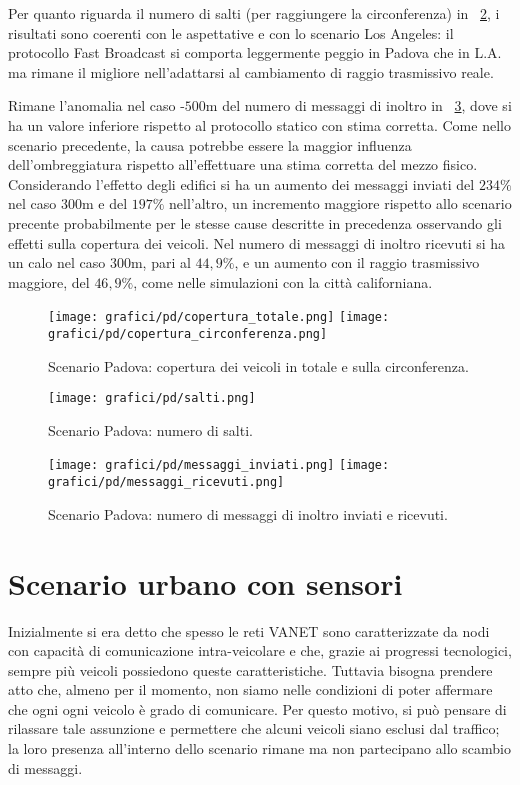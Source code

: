 Per quanto riguarda il numero di salti (per raggiungere la circonferenza) in \figurename~\ref{fig:risultati-padova-salti},
i risultati sono coerenti con le aspettative e con lo scenario Los Angeles:
il protocollo Fast Broadcast si comporta leggermente peggio in Padova che in L.A.
ma rimane il migliore nell'adattarsi al cambiamento di raggio trasmissivo reale.

Rimane l'anomalia nel caso \statica{}-$500$m del numero di messaggi di inoltro in \figurename~\ref{fig:risultati-padova-messaggi},
dove si ha un valore inferiore rispetto al protocollo statico con stima corretta.
Come nello scenario precedente, la causa potrebbe essere la maggior influenza dell'ombreggiatura rispetto
all'effettuare una stima corretta del mezzo fisico.
Considerando l'effetto degli edifici si ha un aumento dei messaggi inviati del $234\%$ nel caso $300$m e del $197\%$ nell'altro,
un incremento maggiore rispetto allo scenario precente probabilmente per le stesse cause
descritte in precedenza osservando gli effetti sulla copertura dei veicoli.
Nel numero di messaggi di inoltro ricevuti si ha un calo nel caso $300$m,
pari al $44,9\%$, e un aumento con il raggio trasmissivo maggiore, del $46,9\%$,
come nelle simulazioni con la città californiana.
%
\begin{figure}[htbp]
	\centering
		\texttt{[image: grafici/pd/copertura\_totale.png]}
		\texttt{[image: grafici/pd/copertura\_circonferenza.png]}
\caption{Scenario Padova: copertura dei veicoli in totale e sulla circonferenza.\label{fig:risultati-padova-copertura}}
\end{figure}
%
\begin{figure}[htbp]
	\centering
		\texttt{[image: grafici/pd/salti.png]}
\caption{Scenario Padova: numero di salti.\label{fig:risultati-padova-salti}}
\end{figure}
%
\begin{figure}[htbp]
	\centering
		\texttt{[image: grafici/pd/messaggi\_inviati.png]}
		\texttt{[image: grafici/pd/messaggi\_ricevuti.png]}
\caption{Scenario Padova: numero di messaggi di inoltro inviati e ricevuti.\label{fig:risultati-padova-messaggi}}
\end{figure}
\clearpage
%
%
\section{Scenario urbano con sensori}
Inizialmente si era detto che spesso le reti VANET sono caratterizzate da nodi con capacità di comunicazione
intra-veicolare e che, grazie ai progressi tecnologici, sempre più veicoli possiedono queste caratteristiche.
Tuttavia bisogna prendere atto che, almeno per il momento, non siamo nelle condizioni
di poter affermare che ogni ogni veicolo è grado di comunicare.
Per questo motivo, si può pensare di rilassare tale assunzione e permettere che alcuni veicoli
siano esclusi dal traffico; la loro presenza all'interno dello scenario rimane ma non partecipano allo scambio di messaggi.

